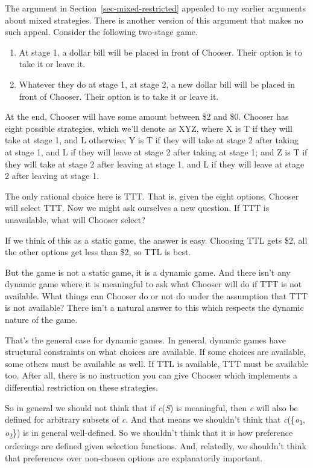 \documentclass[
  12pt,
  letterpaper,
  DIV=11,
  numbers=noendperiod]{scrreprt}
\providecommand{\tightlist}{%
  \setlength{\itemsep}{0pt}\setlength{\parskip}{0pt}}\usepackage{longtable,booktabs,array}
\begin{document}
The argument in Section~\ref{sec-mixed-restricted} appealed to my
earlier arguments about mixed strategies. There is another version of
this argument that makes no such appeal. Consider the following
two-stage game.

\begin{enumerate}
\def\labelenumi{\arabic{enumi}.}
\tightlist
\item
  At stage 1, a dollar bill will be placed in front of Chooser. Their
  option is to take it or leave it.
\item
  Whatever they do at stage 1, at stage 2, a new dollar bill will be
  placed in front of Chooser. Their option is to take it or leave it.
\end{enumerate}

At the end, Chooser will have some amount between \$2 and \$0. Chooser
has eight possible strategies, which we'll denote as XYZ, where X is T
if they will take at stage 1, and L otherwise; Y is T if they will take
at stage 2 after taking at stage 1, and L if they will leave at stage 2
after taking at stage 1; and Z is T if they will take at stage 2 after
leaving at stage 1, and L if they will leave at stage 2 after leaving at
stage 1.

The only rational choice here is TTT. That is, given the eight options,
Chooser will select TTT. Now we might ask ourselves a new question. If
TTT is unavailable, what will Chooser select?

If we think of this as a static game, the answer is easy. Choosing TTL
gets \$2, all the other options get less than \$2, so TTL is best.

But the game is not a static game, it is a dynamic game. And there isn't
any dynamic game where it is meaningful to ask what Chooser will do if
TTT is not available. What things can Chooser do or not do under the
assumption that TTT is not available? There isn't a natural answer to
this which respects the dynamic nature of the game.

That's the general case for dynamic games. In general, dynamic games
have structural constraints on what choices are available. If some
choices are available, some others must be available as well. If TTL is
available, TTT must be available too. After all, there is no instruction
you can give Chooser which implements a differential restriction on
these strategies.

So in general we should not think that if \emph{c}(\emph{S}) is
meaningful, then \emph{c} will also be defined for arbitrary subsets of
\emph{c}. And that means we shouldn't think that
\emph{c}(\{\emph{o}\textsubscript{1}, \emph{o}\textsubscript{2}\}) is in
general well-defined. So we shouldn't think that it is how preference
orderings are defined given selection functions. And, relatedly, we
shouldn't think that preferences over non-chosen options are
explanatorily important.
\end{document}
